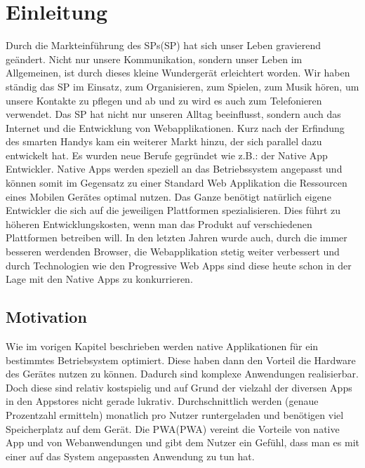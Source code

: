 \chapter{Einleitung}\label{chap:Einleitung}
\thispagestyle{standard}
\pagestyle{standard}
\renewcommand{\footrulewidth}{0.4pt}

Durch die Markteinführung des \acl{SP}s(\acs{SP}) hat sich unser Leben gravierend geändert. 
Nicht nur unsere Kommunikation, sondern unser Leben im Allgemeinen, ist durch dieses kleine Wundergerät erleichtert worden.
Wir haben ständig das \acs{SP} im Einsatz, zum Organisieren, zum Spielen, zum Musik hören, um unsere Kontakte zu pflegen und ab und zu wird es auch zum Telefonieren verwendet.
Das \acs{SP} hat nicht nur unseren Alltag beeinflusst, sondern auch das Internet und die Entwicklung von Webapplikationen. Kurz nach der Erfindung des smarten Handys kam ein weiterer Markt 
hinzu, der sich parallel dazu entwickelt hat. Es wurden neue Berufe gegründet wie z.B.: der Native App Entwickler.
Native Apps werden speziell an das Betriebssystem angepasst und können somit im Gegensatz zu einer Standard Web Applikation die Ressourcen eines Mobilen Gerätes optimal nutzen. 
Das Ganze benötigt natürlich eigene Entwickler die sich auf die jeweiligen Plattformen spezialisieren.
Dies führt zu höheren Entwicklungskosten, wenn man das Produkt auf verschiedenen Plattformen betreiben will.
In den letzten Jahren wurde auch, durch die immer besseren werdenden Browser, die Webapplikation stetig weiter verbessert und durch 
Technologien wie den Progressive Web Apps sind diese heute schon in der Lage mit den Native Apps zu konkurrieren. 




\section{Motivation} \label{sub:Motivation}
Wie im vorigen Kapitel beschrieben werden native Applikationen für ein bestimmtes Betriebsystem optimiert. Diese haben dann den Vorteil die Hardware des Gerätes nutzen zu können. 
Dadurch sind komplexe Anwendungen realisierbar. Doch diese sind relativ kostspielig und auf Grund der vielzahl der diversen Apps in den Appstores nicht gerade lukrativ.
Durchschnittlich werden (genaue Prozentzahl ermitteln) monatlich pro Nutzer runtergeladen und benötigen viel Speicherplatz auf dem Gerät.
Die \acl{PWA}(\acs{PWA}) vereint die Vorteile von native App und von Webanwendungen und gibt dem Nutzer ein Gefühl, dass man es mit einer auf das System angepassten Anwendung zu tun hat.




